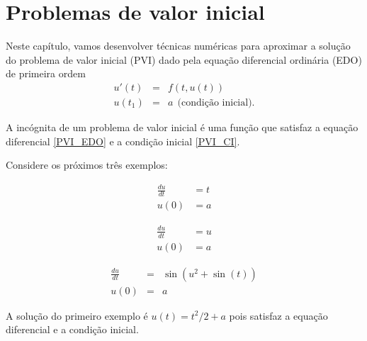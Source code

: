 
%

\chapter{Problemas de valor inicial}
Neste capítulo, vamos desenvolver técnicas numéricas para aproximar a solução do problema de valor inicial (PVI) dado pela equação diferencial ordinária (EDO) de primeira ordem
\begin{subequations}\label{PVI}
\begin{eqnarray}
  u'(t) &=& f(t, u(t))\label{PVI_EDO}\\
  u(t_1) &=& a ~~ \text{(condição inicial)}.\label{PVI_CI}
\end{eqnarray}
\end{subequations}

A incógnita de um problema de valor inicial é uma função que satisfaz a equação diferencial \eqref{PVI_EDO}  e a condição inicial \eqref{PVI_CI}.

Considere os próximos três exemplos:
\begin{ex}
\begin{eqnarray}
   \frac{du}{dt} &=t\\
            u(0) &= a
\end{eqnarray}
\end{ex}

\begin{ex}
\begin{eqnarray}
   \frac{du}{dt} &=u\\
            u(0) &= a
\end{eqnarray}
\end{ex}

\begin{ex}
\begin{eqnarray}
   \frac{du}{dt} &=&\sin(u^2+\sin(t))\\
            u(0) &=& a
\end{eqnarray}
\end{ex}

A solução do primeiro exemplo é $u(t)=t^2/2+a$ pois satisfaz a equação diferencial e a condição inicial.

